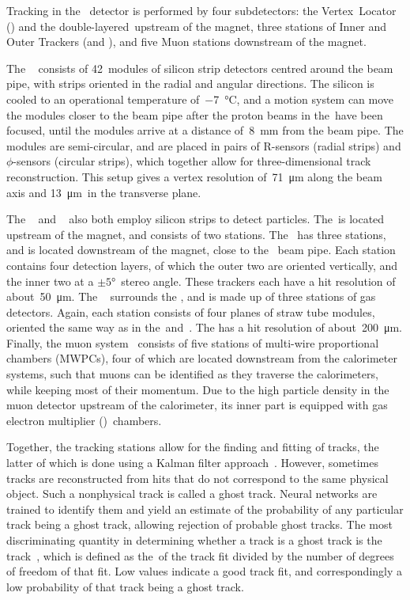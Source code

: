 Tracking in the \lhcb~detector is performed by four subdetectors: the Vertex~Locator (\velo) and the double-layered~\ttracker upstream of the magnet, three stations of Inner and Outer Trackers (\intr and \ot), and five Muon stations downstream of the magnet.

The \velo~\cite{LHCb-DP-2014-001} consists of \num{42}~modules of silicon strip detectors centred around the beam pipe, with strips oriented in the radial and angular directions.
The silicon is cooled to an operational temperature of~\SI{-7}{\degreeCelsius}, and a motion system can move the modules closer to the beam pipe after the proton beams in the~\lhc have been focused, until the modules arrive at a distance of~\SI{8}{\mm} from the beam pipe.
The modules are semi-circular, and are placed in pairs of R-sensors (radial strips) and \(\phi\)-sensors (circular strips), which together allow for three-dimensional track reconstruction.
This setup gives a vertex resolution of~\SI{71}{\micro\meter} along the beam axis and \SI{13}{\micro\meter}~in the transverse plane.

The \ttracker~\cite{Gassner:728548} and \intr~\cite{LHCb-TDR-008} also both employ silicon strips to detect particles.
The~\ttracker is located upstream of the magnet, and consists of two stations.
The \intr~has three stations, and is located downstream of the magnet, close to the \lhc~beam pipe.
Each station contains four detection layers, of which the outer two are oriented vertically, and the inner two at a \(\pm\ang{5}\)~stereo angle.
These trackers each have a hit resolution of about~\SI{50}{\micro\meter}.
The \ot~\cite{LHCb-DP-2013-003} surrounds the \intr, and is made up of three stations of gas detectors.
Again, each station consists of four planes of straw tube modules, oriented the same way as in the~\ttracker and~\intr.
The \ot has a hit resolution of about~\SI{200}{\micro\meter}.
Finally, the muon system~\cite{LHCb-DP-2012-002,LHCb-DP-2013-001} consists of five stations of multi-wire proportional chambers (MWPCs), four of which are located downstream from the calorimeter systems, such that muons can be identified as they traverse the calorimeters, while keeping most of their momentum.
Due to the high particle density in the muon detector upstream of the calorimeter, its inner part is equipped with gas electron multiplier (\gem)~chambers.

Together, the tracking stations allow for the finding and fitting of tracks, the latter of which is done using a Kalman filter approach~\cite{Hulsbergen2005566}.
However, sometimes tracks are reconstructed from hits that do not correspond to the same physical object.
Such a nonphysical track is called a ghost track.
Neural networks are trained to identify them and yield an estimate of the probability of any particular track being a ghost track, allowing rejection of probable ghost tracks.
The most discriminating quantity in determining whether a track is a ghost track is the track~\chisqndf, which is defined as the~\chisq of the track fit divided by the number of degrees of freedom of that fit.
Low values indicate a good track fit, and correspondingly a low probability of that track being a ghost track.


